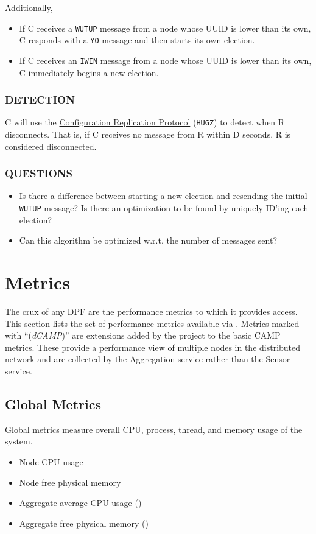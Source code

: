Additionally,

\begin{itemize}
\item If C receives a \texttt{WUTUP} message from a node whose UUID is lower than its own, C responds with a \texttt{YO}
      message and then starts its own election.
\item If C receives an \texttt{IWIN} message from a node whose UUID is lower than its own, C immediately begins a new
      election.
\end{itemize}

\subsubsection{DETECTION}

C will use the \hyperref[proto_config]{Configuration Replication Protocol} (\texttt{HUGZ}) to detect when R disconnects.
That is, if C receives no message from R within D seconds, R is considered disconnected.

\subsubsection{QUESTIONS}

\begin{itemize}
\item Is there a difference between starting a new election and resending the initial \texttt{WUTUP} message? Is there
      an optimization to be found by uniquely ID'ing each election?
\item Can this algorithm be optimized w.r.t. the number of messages sent?
\end{itemize}

\section{\dcamp Metrics}
\label{dcamp_metrics}

The crux of any DPF are the performance metrics to which it provides access. This section lists the set of performance
metrics available via \dcamp. Metrics marked with ``(\emph{dCAMP})'' are extensions added by the \dcamp project to the
basic CAMP metrics. These provide a performance view of multiple nodes in the distributed network and are collected by
the Aggregation service rather than the Sensor service.

\subsection{Global Metrics}
Global metrics measure overall CPU, process, thread, and memory usage of the system.
\begin{itemize}
\item Node CPU usage
\item Node free physical memory
\item Aggregate average CPU usage (\dcamp)
\item Aggregate free physical memory (\dcamp)
\end{itemize}

